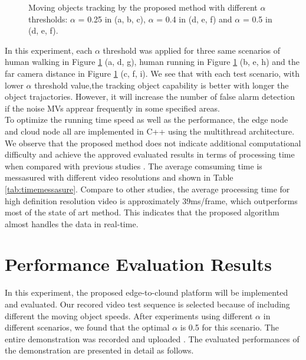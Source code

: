 \begin{figure}
{}
\caption{Moving objects tracking by the proposed method with different $\alpha$ thresholds: $\alpha$ = 0.25 in (a, b, c), $\alpha$ = 0.4 in (d, e, f) and $\alpha$ = 0.5 in (d, e, f).}
\label{fig:objecttracking}
\end{figure}
In this experiment, each $\alpha$ threshold was applied for three same scenarios of human walking in Figure \ref{fig:objecttracking} (a, d, g), human running in Figure \ref{fig:objecttracking} (b, e, h) and the far camera distance in Figure \ref{fig:objecttracking} (c, f, i).  We see that with each test scenario, with lower $\alpha$ threshold value,the tracking object capability is better with longer the object trajactories. However, it will increase the number of false alarm detection if the noise MVs apprear frequently in some specified areas.\\ To optimize the running time speed as well as the performance, the edge node and cloud node all are implemented in C++ using the multithread architecture. We observe that the proposed method does not indicate additional computational difficulty and achieve the approved evaluated results in terms of processing time when compared with previous studies \cite{bombardelli2018efficient} \cite{khatoonabadi2012video}. The average comsuming time  is messasured with different video resolutions and shown in Table \ref{tab:timemessasure}. Compare to other studies, the average processing time for high definition resolution video is approximately 39ms/frame, which outperforms most of the state of art method. This indicates that the proposed algorithm almost handles the data in real-time. 

\section{Performance Evaluation Results}
 In this experiment, the proposed edge-to-clound platform will be implemented and evaluated. Our recored video test sequence is selected because of including different the moving object speeds. After experiments using different $\alpha$ in different scenarios, we found that the optimal $\alpha$ is 0.5 for this scenario. The entire demonstration was recorded and uploaded \cite{source}. The evaluated performances of the demonstration are presented in detail as follows.
 
